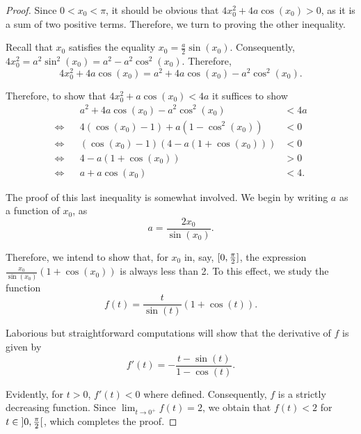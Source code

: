 \begin{proof}
Since $0 < x_0 < \pi$, it should be obvious that $4 x_0^2 + 4 a \cos(x_0) > 0$, as it is a sum of two positive terms. Therefore, we turn to proving the other inequality.

Recall that $x_0$ satisfies the equality $x_0 = \frac a 2 \sin(x_0)$. Consequently, $4 x_0^2 = a^2 \sin^2 (x_0) = a^2 - a^2 \cos^2(x_0)$. Therefore,
\begin{equation}
4 x_0^2 + 4 a \cos(x_0) = a^2 + 4 a \cos(x_0) - a^2 \cos^2(x_0).
\end{equation}

Therefore, to show that $4 x_0^2 + a \cos(x_0) < 4a$ it suffices to show
\begin{equation}\label{eq:ineq4beta}
\begin{aligned}
&& a^2 + 4 a \cos(x_0) - a^2 \cos^2(x_0) &< 4a\\
\iff&& 4 (\cos(x_0)-1) + a(1 - \cos^2(x_0)) &< 0\\
\iff&& (\cos(x_0) - 1)(4 - a(1 + \cos(x_0))) &< 0\\
\iff&& 4 - a(1+ \cos(x_0)) &> 0\\
\iff&& a + a \cos(x_0) &< 4.
\end{aligned}
\end{equation}

The proof of this last inequality is somewhat involved. We begin by writing $a$ as a function of $x_0$, as
\begin{equation}
a = \frac{2 x_0}{\sin(x_0)}.
\end{equation}

Therefore, we intend to show that, for $x_0$ in, say, $\interval 0 {\frac \pi 2}$, the expression $\frac{x_0}{\sin(x_0)}(1 + \cos(x_0))$ is always less than 2. To this effect, we study the function
\begin{equation}
f(t) = \frac{t}{\sin(t)}(1 + \cos(t)).
\end{equation}

Laborious but straightforward computations will show that the derivative of $f$ is given by
\begin{equation}
f'(t) = - \frac{t - \sin(t)}{1 - \cos(t)}.
\end{equation}

Evidently, for $t > 0$, $f'(t) < 0$ where defined. Consequently, $f$ is a strictly decreasing function. Since $\lim_{t \to 0^+} f(t) = 2$, we obtain that $f(t) < 2$ for $t \in \ointerval 0 {\frac \pi 2}$, which completes the proof.
\end{proof}

